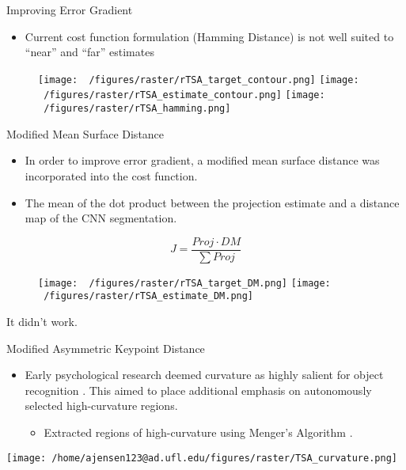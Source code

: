 \documentclass[presentation, aspectratio=1610]{beamer}
\begin{document}
\begin{frame}[label={sec:orgcfc33f7}]{Improving Error Gradient}
\begin{itemize}
\item Current cost function formulation (Hamming Distance) is not well suited to ``near'' and ``far'' estimates
\end{itemize}
\begin{figure}[h!]
	\centering
	\texttt{[image: ~/figures/raster/rTSA\_target\_contour.png]}
	\texttt{[image: ~/figures/raster/rTSA\_estimate\_contour.png]}
	\texttt{[image: ~/figures/raster/rTSA\_hamming.png]}
\end{figure}
\end{frame}
\begin{frame}[label={sec:orgbeb0bbb}]{Modified Mean Surface Distance}
\begin{itemize}
\item In order to improve error gradient, a modified mean surface distance was incorporated into the cost function.
\item The mean of the dot product between the projection estimate and a distance map of the CNN segmentation.
\end{itemize}
\begin{equation}
  \label{eq:DMCF}
  J = \dfrac{Proj \cdot DM}{\sum Proj}
\end{equation}

\begin{figure}[h!]
	\centering
	\texttt{[image: ~/figures/raster/rTSA\_target\_DM.png]}
	\texttt{[image: ~/figures/raster/rTSA\_estimate\_DM.png]}
\end{figure}
\vspace{-5mm}
{\tiny It didn't work.}
\end{frame}
\begin{frame}[label={sec:orgd0a8e0a}]{Modified Asymmetric Keypoint Distance}
\begin{itemize}
\item Early psychological research deemed curvature as highly salient for object recognition \autocites{attneaveInformationalAspectsVisual1954}[][]{attneaveQuantitativeStudyShape1956}. This aimed to place additional emphasis on autonomously selected high-curvature regions.
\begin{itemize}
\item Extracted regions of high-curvature using Menger's Algorithm \autocite{legerMengerCurvatureRectifiability1999}.
\end{itemize}
\end{itemize}

\begin{center}
\texttt{[image: /home/ajensen123@ad.ufl.edu/figures/raster/TSA\_curvature.png]}
\end{center}
\end{frame}
\end{document}
